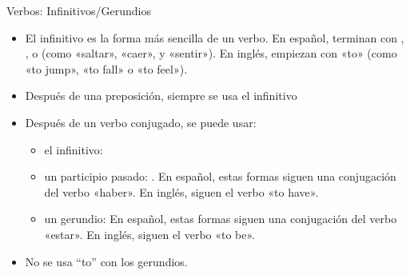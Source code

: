 \begin{conf}{Verbos: Infinitivos/Gerundios}
	\begin{itemize}
		\item El infinitivo es la forma más sencilla de un verbo.
			En español, terminan con , , o 
			(como «saltar», «caer», y «sentir»). En inglés, empiezan con «to»
			(como «to jump», «to fall» o «to feel»).
		\item Después de una preposición, siempre se usa el infinitivo
		\item Después de un verbo conjugado, se puede usar:
			\begin{itemize}
				\item el infinitivo:  \arr {}
				\item un participio pasado:  \arr {}.
					En español, estas formas siguen una conjugación del verbo «haber».
					En inglés, siguen el verbo «to have».
				\item un gerundio:  \arr {}
					En español, estas formas siguen una conjugación del verbo «estar».
					En inglés, siguen el verbo «to be».
			\end{itemize}
		\item No se usa ``to'' con los gerundios.
	\end{itemize}
\end{conf}

